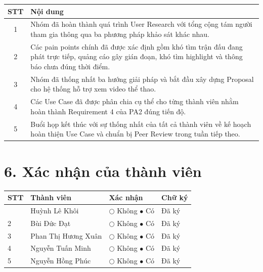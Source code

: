 \documentclass[11pt,a4paper]{article}
\begin{document}
\begin{tabularx}{\textwidth}{|c|X|}
\hline
\rowcolor{gray!20}
\textbf{STT} &
\textbf{Nội dung}\\
\hline

1 &
Nhóm đã hoàn thành quá trình User Research với tổng cộng tám người tham gia thông qua ba phương pháp khảo sát khác nhau.\\
\hline

2 &
Các pain points chính đã được xác định gồm khó tìm trận đấu đang phát trực tiếp, quảng cáo gây gián đoạn, khó tìm highlight và thông báo chưa đúng thời điểm.\\
\hline

3 &
Nhóm đã thống nhất ba hướng giải pháp và bắt đầu xây dựng Proposal cho hệ thống hỗ trợ xem video thể thao.\\
\hline

4 &
Các Use Case đã được phân chia cụ thể cho từng thành viên nhằm hoàn thành Requirement 4 của PA2 đúng tiến độ.\\
\hline

5 &
Buổi họp kết thúc với sự thống nhất của tất cả thành viên về kế hoạch hoàn thiện Use Case và chuẩn bị Peer Review trong tuần tiếp theo.\\
\hline

\end{tabularx}


\section*{6. Xác nhận của thành viên}

\begin{tabularx}{\textwidth}{|>{\centering\arraybackslash}p{0.8cm}|X|>{\centering\arraybackslash}p{3.8cm}|>{\centering\arraybackslash}p{2.5cm}|}
\hline
\rowcolor{gray!20}
\textbf{STT} &
\centering\textbf{Thành viên} &
\textbf{Xác nhận} &
\textbf{Chữ ký}\\
\hline

1 &
Huỳnh Lê Khôi &
$\bigcirc$ Không \qquad $\bullet$ Có &
Đã ký\\
\hline

2 &
Bùi Đức Đạt &
$\bigcirc$ Không \qquad $\bullet$ Có &
Đã ký\\
\hline

3 &
Phan Thị Hương Xuân &
$\bigcirc$ Không \qquad $\bullet$ Có &
Đã ký\\
\hline

4 &
Nguyễn Tuấn Minh &
$\bigcirc$ Không \qquad $\bullet$ Có &
Đã ký\\
\hline

5 &
Nguyễn Hồng Phúc &
$\bigcirc$ Không \qquad $\bullet$ Có &
Đã ký\\
\hline

\end{tabularx}
\end{document}
